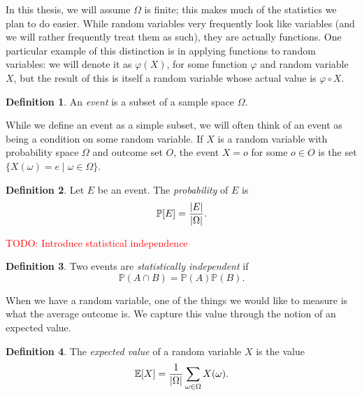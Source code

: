 \documentclass[english,12pt]{reedthesis}
\theoremstyle{plain}
\theoremstyle{definition}
\newtheorem{defn}[defn]{Definition}
\theoremstyle{remark}
\DeclarePairedDelimiter{\abs}{\lvert}{\rvert}
\newcommand{\TODO}[1]{\textcolor{red}{TODO: #1}}
\begin{document}
In this thesis, we will assume $\Omega$ is finite; this makes much of the statistics
we plan to do easier. While random variables very frequently look like variables
(and we will rather frequently treat them as such), they are actually functions.
One particular example of this distinction is in applying functions to random
variables: we will denote it as $\varphi(X)$, for some function $\varphi$ and random
variable $X$, but the result of this is itself a random variable whose actual
value is $\varphi \circ X$.

\begin{defn}\label{def:event}
  An \emph{event} is a subset of a sample space $\Omega$.
\end{defn}

While we define an event as a simple subset, we will often think of an event as
being a condition on some random variable. If $X$ is a random variable with
probability space $\Omega$ and outcome set $O$, the event $X = o$ for some $o \in O$ is
the set $\{X(\omega) = e \mid \omega \in \Omega\}$.

\begin{defn}\label{def:probability}
  Let $E$ be an event. The \emph{probability} of $E$ is
  \begin{equation*}
    \mathbb{P}[E] = \frac{\abs{E}}{\abs{\Omega}}.
  \end{equation*}
\end{defn}

\TODO{Introduce statistical independence}

\begin{defn}\label{def:stat-indep}
  Two events are \emph{statistically independent} if
  \[
    \mathbb{P}(A \cap B) = \mathbb{P}(A)\mathbb{P}(B).
  \]
\end{defn}

When we have a random variable, one of the things we would like to measure is
what the average outcome is. We capture this value through the notion of an
expected value.

\begin{defn}\label{def:expected-val}
  The \emph{expected value} of a random variable $X$ is the value
  \begin{equation*}
    \mathbb{E}[X] = \frac{1}{\abs{\Omega}}\sum_{\omega \in \Omega}X(\omega).
  \end{equation*}
\end{defn}
\end{document}
